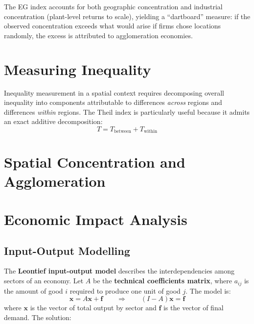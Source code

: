 The EG index accounts for both geographic concentration and industrial
concentration (plant-level returns to scale), yielding a ``dartboard''
measure: if the observed concentration exceeds what would arise if firms
chose locations randomly, the excess is attributed to agglomeration
economies.


\section{Measuring Inequality}
\label{sec_Inequality}


Inequality measurement in a spatial context requires decomposing overall
inequality into components attributable to differences \emph{across} regions
and differences \emph{within} regions. The Theil index is particularly useful
because it admits an exact additive decomposition:
\begin{equation}
  T = T_\text{between} + T_\text{within}
\end{equation}



\section{Spatial Concentration and Agglomeration}
\label{sec_SpatialConc}



\section{Economic Impact Analysis}
\label{sec_EconImpact}

\subsection{Input-Output Modelling}
\label{subsec_IO}

The \textbf{Leontief input-output model} describes
the interdependencies among sectors of an economy. Let $A$ be the
\textbf{technical coefficients matrix},
where $a_{ij}$ is the amount of good $i$ required to produce one unit of
good $j$. The model is:
\begin{equation}
  \mathbf{x} = A\mathbf{x} + \mathbf{f}
  \qquad\Longrightarrow\qquad
  (I - A)\mathbf{x} = \mathbf{f}
\end{equation}
where $\mathbf{x}$ is the vector of total output by sector and $\mathbf{f}$
is the vector of final demand. The solution:

